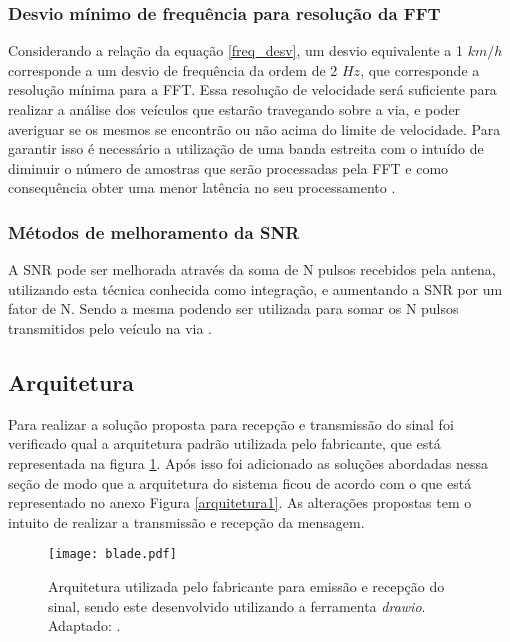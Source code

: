 \subsubsection{Desvio mínimo de frequência para resolução da FFT}
 Considerando a relação da equação \ref{freq_desv}, um desvio equivalente a 1 $km/h$ corresponde a um desvio de frequência da ordem de 2 $Hz$, que corresponde a resolução mínima para a FFT. Essa resolução de velocidade será suficiente para realizar a análise dos veículos que estarão travegando sobre a via, e poder averiguar se os mesmos se encontrão ou não acima do limite de velocidade. Para garantir isso é necessário a utilização de uma banda estreita com o intuído de diminuir o número de amostras que serão processadas pela FFT e como consequência obter uma menor latência no seu processamento \cite{fft}.
\subsubsection{Métodos de melhoramento da SNR}%
A SNR pode ser melhorada através da soma de N pulsos recebidos pela antena, utilizando esta técnica conhecida como integração, %
e aumentando a SNR por um fator de N. Sendo a mesma podendo ser utilizada para somar os N pulsos transmitidos pelo veículo na via \cite{richards}.
\subsection{Arquitetura}
Para realizar a solução proposta para recepção e transmissão do sinal foi verificado qual a arquitetura padrão utilizada pelo fabricante, que está representada na figura \ref{arquitetura}. Após isso foi adicionado as soluções abordadas nessa seção de modo que a arquitetura do sistema ficou de acordo com o que está representado no anexo  Figura \ref{arquitetura1}. As alterações propostas tem o intuito de realizar a transmissão e recepção da mensagem. \cite{pedroni}
\begin{figure}[H]
    \centering
   \texttt{[image: blade.pdf]}
   \caption{Arquitetura utilizada pelo fabricante para emissão e recepção do sinal, sendo este desenvolvido utilizando a ferramenta \emph{drawio}. Adaptado:  \cite{hosted}.}
   \label{arquitetura}
    \end{figure} 
